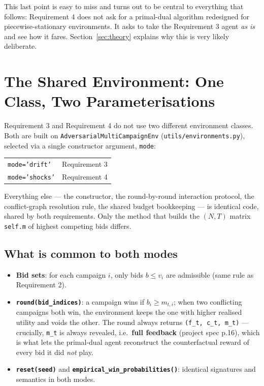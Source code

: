 \documentclass[11pt,a4paper]{article}
\newcommand{\1}{\mathbf{1}}
\begin{document}
This last point is easy to miss and turns out to be central to everything that follows: Requirement 4 does not ask for a primal-dual algorithm redesigned for piecewise-stationary environments. It asks to take the Requirement 3 agent \emph{as is} and see how it fares. Section~\ref{sec:theory} explains why this is very likely deliberate.

\section{The Shared Environment: One Class, Two Parameterisations}

Requirement 3 and Requirement 4 do not use two different environment classes. Both are built on \texttt{AdversarialMultiCampaignEnv} (\texttt{utils/environments.py}), selected via a single constructor argument, \texttt{mode}:

\begin{center}
\begin{tabular}{@{}ll@{}}
\toprule
\texttt{mode='drift'} & Requirement 3 \\
\texttt{mode='shocks'} & Requirement 4 \\
\bottomrule
\end{tabular}
\end{center}

Everything else --- the constructor, the round-by-round interaction protocol, the conflict-graph resolution rule, the shared budget bookkeeping --- is identical code, shared by both requirements. Only the method that builds the $(N,T)$ matrix \texttt{self.m} of highest competing bids differs.

\subsection{What is common to both modes}

\begin{itemize}[leftmargin=1.4em]
  \item \textbf{Bid sets}: for each campaign $i$, only bids $b \le v_i$ are admissible (same rule as Requirement 2).
  \item \textbf{\texttt{round(bid\_indices)}}: a campaign wins if $b_i \ge m_{t,i}$; when two conflicting campaigns both win, the environment keeps the one with higher realised utility and voids the other. The round always returns \texttt{(f\_t, c\_t, m\_t)} --- crucially, \texttt{m\_t} is always revealed, i.e.\ \textbf{full feedback} (project spec p.16), which is what lets the primal-dual agent reconstruct the counterfactual reward of every bid it did \emph{not} play.
  \item \textbf{\texttt{reset(seed)}} and \textbf{\texttt{empirical\_win\_probabilities()}}: identical signatures and semantics in both modes.
\end{itemize}
\end{document}
